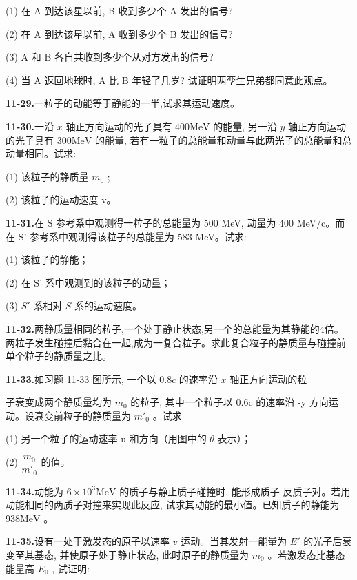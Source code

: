 (1) 在 A 到达该星以前, B 收到多少个 A 发出的信号?

(2) 在 A 到达该星以前, A 收到多少个 B 发出的信号?

(3) A 和 B 各自共收到多少个从对方发出的信号?

(4) 当 A 返回地球时, A 比 B 年轻了几岁? 试证明两孪生兄弟都同意此观点。

\vfill


\textbf{11-29.}一粒子的动能等于静能的一半,试求其运动速度。

\vfill\newpage

\textbf{11-30.}一沿 $x$ 轴正方向运动的光子具有 $400 \mathrm{MeV}$ 的能量, 另一沿 $y$ 轴正方向运动的光子具有 $300 \mathrm{MeV}$ 的能量, 若有一粒子的总能量和动量与此两光子的总能量和总动量相同。试求:

(1) 该粒子的静质量 $m_{0}$ ;

(2) 该粒子的运动速度 v。

\vfill


\textbf{11-31.}在 S 参考系中观测得一粒子的总能量为 500 MeV, 动量为 400 MeV/c。而在 S' 参考系中观测得该粒子的总能量为 583 MeV。试求:

(1) 该粒子的静能；

(2) 在 S' 系中观测到的该粒子的动量；

(3) $S'$ 系相对 $S$ 系的运动速度。

\vfill\newpage

\textbf{11-32.}两静质量相同的粒子,一个处于静止状态,另一个的总能量为其静能的4倍。两粒子发生碰撞后黏合在一起,成为一复合粒子。求此复合粒子的静质量与碰撞前单个粒子的静质量之比。

\vfill


\textbf{11-33.}如习题 11-33 图所示, 一个以 $0.8c$ 的速率沿 $x$ 轴正方向运动的粒

子衰变成两个静质量均为 $m_{0}$ 的粒子, 其中一个粒子以 0.6c 的速率沿 -y 方向运动。设衰变前粒子的静质量为 $m'_{0}$ 。试求

(1) 另一个粒子的运动速率 u 和方向（用图中的 $\theta$ 表示）；

(2) $\dfrac{m_{0}}{m'_{0}}$ 的值。



\vfill\newpage

\textbf{11-34.}动能为 $6 \times 10^{3} \mathrm{MeV}$ 的质子与静止质子碰撞时, 能形成质子-反质子对。若用动能相同的两质子对撞来实现此反应, 试求其动能的最小值。已知质子的静能为 $938 \mathrm{MeV}$ 。

\vfill


\textbf{11-35.}设有一处于激发态的原子以速率 $v$ 运动。当其发射一能量为 $E'$ 的光子后衰变至其基态, 并使原子处于静止状态, 此时原子的静质量为 $m_0$ 。若激发态比基态能量高 $E_0$ , 试证明:

